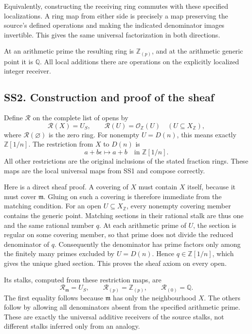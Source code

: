Equivalently, constructing the receiving ring commutes with these
specified localizations. A ring map from either side is precisely a map
preserving the source's defined operations and making the indicated
denominator images invertible. This gives the same universal
factorization in both directions.

At an arithmetic prime the resulting ring is \(\mathbb Z_{(p)}\), and at
the arithmetic generic point it is \(\mathbb Q\). All local additions
there are operations on the explicitly localized integer receiver.

\subsection{SS2. Construction and proof of the
sheaf}\label{ss2.-construction-and-proof-of-the-sheaf}

Define \(\mathcal R\) on the complete list of opens by \[
 \mathcal R(X)=U_S,\qquad
 \mathcal R(U)=\mathcal O_{\mathbb Z}(U)\quad
 (U\subseteq X_{\mathbb Z}),
\tag{SS2.1}
\] where \(\mathcal R(\varnothing)\) is the zero ring. For nonempty
\(U=D(n)\), this means exactly \(\mathbb Z[1/n]\). The restriction from
\(X\) to \(D(n)\) is \[
 a+b\epsilon\longmapsto a+b\quad\text{in }\mathbb Z[1/n].
\tag{SS2.2}
\] All other restrictions are the original inclusions of the stated
fraction rings. These maps are the local universal maps from SS1 and
compose correctly.

Here is a direct sheaf proof. A covering of \(X\) must contain \(X\)
itself, because it must cover \(\mathfrak m\). Gluing on such a covering
is therefore immediate from the matching condition. For an open
\(U\subseteq X_{\mathbb Z}\), every nonempty covering member contains
the generic point. Matching sections in their rational stalk are thus
one and the same rational number \(q\). At each arithmetic prime of
\(U\), the section is regular on some covering member, so that prime
does not divide the reduced denominator of \(q\). Consequently the
denominator has prime factors only among the finitely many primes
excluded by \(U=D(n)\). Hence \(q\in\mathbb Z[1/n]\), which gives the
unique glued section. This proves the sheaf axiom on every open.

Its stalks, computed from these restriction maps, are \[
 \mathcal R_{\mathfrak m}=U_S,\qquad
 \mathcal R_{(p)}=\mathbb Z_{(p)},\qquad
 \mathcal R_{(0)}=\mathbb Q.
\tag{SS2.3}
\] The first equality follows because \(\mathfrak m\) has only the
neighbourhood \(X\). The others follow by allowing all denominators
absent from the specified arithmetic prime. These are exactly the
universal additive receivers of the source stalks, not different stalks
inferred only from an analogy.

